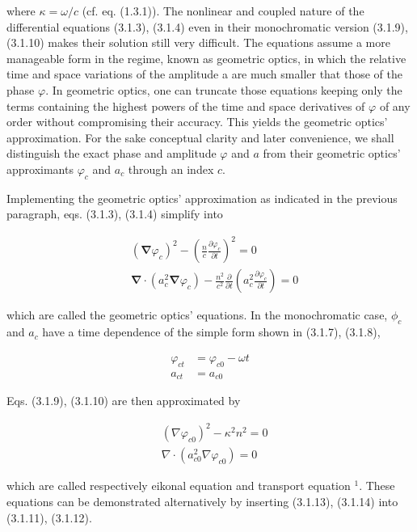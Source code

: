 \documentclass{article}
\begin{document}
where $\kappa=\omega / c$ (cf. eq. (1.3.1)).
The nonlinear and coupled nature of the differential equations (3.1.3), (3.1.4)
even in their monochromatic version (3.1.9), (3.1.10) makes their solution still very difficult. The equations assume a more manageable form in the regime, known as geometric optics, in which the relative time and space variations of the amplitude a are much smaller that those of the phase $\varphi$. In geometric optics, one can truncate those equations keeping only the terms containing the highest powers of the time and space derivatives of $\varphi$ of any order without compromising their accuracy. This yields the geometric optics' approximation. For the sake conceptual clarity and later convenience, we shall distinguish the exact phase and amplitude $\varphi$ and $a$ from their geometric optics' approximants $\varphi_{c}$ and $a_{c}$ through an index $c$.

Implementing the geometric optics' approximation as indicated in the previous paragraph, eqs. (3.1.3), (3.1.4) simplify into
 
\begin{align*}
& \left(\boldsymbol{\nabla} \varphi_{c}\right)^{2}-\left(\frac{n}{c} \frac{\partial \varphi_{c}}{\partial t}\right)^{2}=0  \tag{3.1.11}\\
& \boldsymbol{\nabla} \cdot\left(a_{c}^{2} \boldsymbol{\nabla} \varphi_{c}\right)-\frac{n^{2}}{c^{2}} \frac{\partial}{\partial t}\left(a_{c}^{2} \frac{\partial \varphi_{c}}{\partial t}\right)=0 \tag{3.1.12}
\end{align*}
 
which are called the geometric optics' equations. In the monochromatic case, $\phi_{c}$ and $a_{c}$ have a time dependence of the simple form shown in (3.1.7), (3.1.8),
 
\begin{align*}
\varphi_{c t} & =\varphi_{c 0}-\omega t  \tag{3.1.13}\\
a_{c t} & =a_{c 0} \tag{3.1.14}
\end{align*}
 

Eqs. (3.1.9), (3.1.10) are then approximated by
 
\begin{align*}
& \left(\nabla \varphi_{c 0}\right)^{2}-\kappa^{2} n^{2}=0  \tag{3.1.15}\\
& \nabla \cdot\left(a_{c 0}^{2} \nabla \varphi_{c 0}\right)=0 \tag{3.1.16}
\end{align*}
 
which are called respectively eikonal equation and transport equation ${ }^{1}$. These
equations can be demonstrated alternatively by inserting (3.1.13), (3.1.14) into (3.1.11), (3.1.12).
\end{document}
